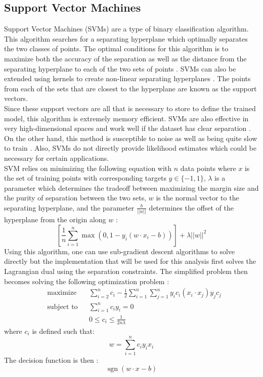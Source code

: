 \documentclass[titlepage]{article}
\DeclareMathOperator{\sgn}{sgn}
\newcommand{\norm}[1]{\lvert\lvert #1 \rvert\rvert}
\begin{document}
\subsection{Support Vector Machines}
Support Vector Machines (SVMs) are a type of binary classification algorithm. This algorithm searches for a separating hyperplane which optimally separates the two classes of points. The optimal conditions for this algorithm is to maximize both the accuracy of the separation as well as the distance from the separating hyperplane to each of the two sets of points \cite{SVM}. SVMs can also be extended using kernels to create non-linear separating hyperplanes \cite{SVM}. The points from each of the sets that are closest to the hyperplane are known as the support vectors.\\
Since these support vectors are all that is necessary to store to define the trained model, this algorithm is extremely memory efficient. SVMs are also effective in very high-dimensional spaces and work well if the dataset has clear separation \cite{SVM}. On the other hand, this method is susceptible to noise as well as being quite slow to train \cite{SVMSpeed}. Also, SVMs do not directly provide likelihood estimates which could be necessary for certain applications.\\
SVM relies on minimizing the following equation with $n$ data points where $x$ is the set of training points with corresponding targets $y \in \{-1, 1\}$, $\lambda$ is a parameter which determines the tradeoff between maximizing the margin size and the purity of separation between the two sets, $w$ is the normal vector to the separating hyperplane, and the parameter $\frac{b}{\norm{w}}$ determines the offset of the hyperplane from the origin along $w$ \cite{SVM}:
$$\left[\frac{1}{n}\sum\limits_{i=1}^n \max(0, 1 - y_i(w \cdot x_i - b))\right] + \lambda\norm{w}^2$$
Using this algorithm, one can use sub-gradient descent algorithms to solve directly \cite{SVMGradient} but the implementation that will be used for this analysis first solves the Lagrangian dual using the separation constraints. The simplified problem then becomes solving the following optimization problem \cite{SVM}:
\begin{equation*}
\begin{aligned}
& \underset{}{\text{maximize}}
& & \sum\limits_{i=2}^n c_i - \frac{1}{2}\sum\limits_{i=1}^n \sum\limits_{j=1}^n y_i c_i (x_i \cdot x_j) y_j c_j \\
& \text{subject to}
& & \sum\limits_{i=1}^n c_i y_i = 0\\
&&& 0 \leq c_i \leq \frac{1}{2n\lambda}
\end{aligned}
\end{equation*}
where $c_i$ is defined such that:
$$w = \sum\limits_{i=1}^n c_i y_i x_i$$
The decision function is then \cite{SVM}:
$$\sgn(w \cdot x - b)$$
\end{document}
